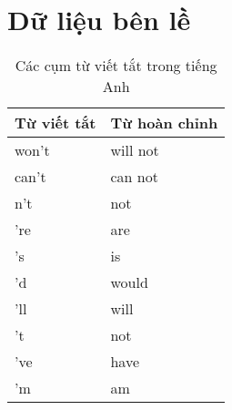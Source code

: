 \section*{Dữ liệu bên lề}
\begin{table}
    \centering
    \caption{Các cụm từ viết tắt trong tiếng Anh}
    \label{table:english-contractions}
    \begin{tabular}{ll}
        \toprule
        \textbf{Từ viết tắt} & \textbf{Từ hoàn chỉnh} \\\midrule
        won't                & will not               \\
        can't                & can not                \\
        n't                  & not                    \\
        're                  & are                    \\
        's                   & is                     \\
        'd                   & would                  \\
        'll                  & will                   \\
        't                   & not                    \\
        've                  & have                   \\
        'm                   & am                     \\
        \bottomrule
    \end{tabular}
\end{table}

